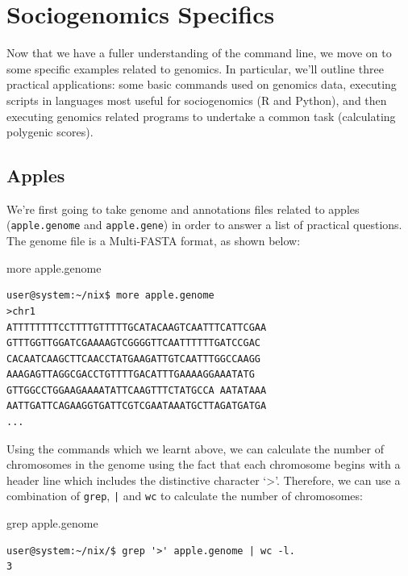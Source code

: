 \documentclass[11pt]{article}
\begin{document}
\section{Sociogenomics Specifics}

Now that we have a fuller understanding of the command line, we move on to some specific examples related to genomics. In particular, we'll outline three practical applications: some basic commands used on genomics data, executing scripts in languages most useful for sociogenomics (R and Python), and then executing genomics related programs to undertake a common task (calculating polygenic scores).

\subsection{Apples}

We're first going to take genome and annotations files related to apples (\texttt{apple.genome} and \texttt{apple.gene}) in order to answer a list of practical questions. The genome file is a Multi-FASTA format, as shown below:\\

\begin{listing}[H]
\caption{more apple.genome}\vspace{-0.1in}
\begin{verbatim}
user@system:~/nix$ more apple.genome
>chr1
ATTTTTTTTCCTTTTGTTTTTGCATACAAGTCAATTTCATTCGAA
GTTTGGTTGGATCGAAAAGTCGGGGTTCAATTTTTTGATCCGAC
CACAATCAAGCTTCAACCTATGAAGATTGTCAATTTGGCCAAGG
AAAGAGTTAGGCGACCTGTTTTGACATTTGAAAAGGAAATATG
GTTGGCCTGGAAGAAAATATTCAAGTTTCTATGCCA AATATAAA
AATTGATTCAGAAGGTGATTCGTCGAATAAATGCTTAGATGATGA
...
\end{verbatim}
\end{listing}

Using the commands which we learnt above, we can calculate the number of chromosomes in the genome using the fact that each chromosome begins with a header line which includes the distinctive character `>'. Therefore, we can use a combination of \texttt{grep}, \texttt{|} and \texttt{wc} to calculate the number of chromosomes:\\

\begin{listing}[H]
\caption{grep apple.genome}\vspace{-0.1in}
\begin{verbatim}
user@system:~/nix/$ grep '>' apple.genome | wc -l. 
3
\end{verbatim}
\end{listing}
\end{document}
